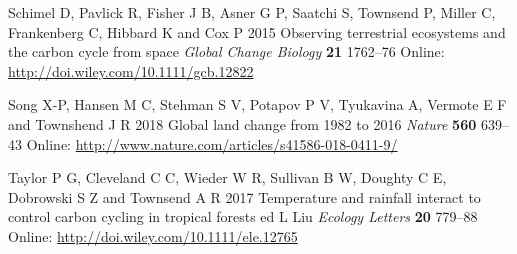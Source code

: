 \documentclass[
]{article}
\begin{document}
\leavevmode\hypertarget{ref-schimel_observing_2015}{}%
Schimel D, Pavlick R, Fisher J B, Asner G P, Saatchi S, Townsend P,
Miller C, Frankenberg C, Hibbard K and Cox P 2015 Observing terrestrial
ecosystems and the carbon cycle from space \emph{Global Change Biology}
\textbf{21} 1762--76 Online:
\url{http://doi.wiley.com/10.1111/gcb.12822}

\leavevmode\hypertarget{ref-song_global_2018}{}%
Song X-P, Hansen M C, Stehman S V, Potapov P V, Tyukavina A, Vermote E F
and Townshend J R 2018 Global land change from 1982 to 2016
\emph{Nature} \textbf{560} 639--43 Online:
\url{http://www.nature.com/articles/s41586-018-0411-9/}

\leavevmode\hypertarget{ref-taylor_temperature_2017}{}%
Taylor P G, Cleveland C C, Wieder W R, Sullivan B W, Doughty C E,
Dobrowski S Z and Townsend A R 2017 Temperature and rainfall interact to
control carbon cycling in tropical forests ed L Liu \emph{Ecology
Letters} \textbf{20} 779--88 Online:
\url{http://doi.wiley.com/10.1111/ele.12765}
\end{document}
